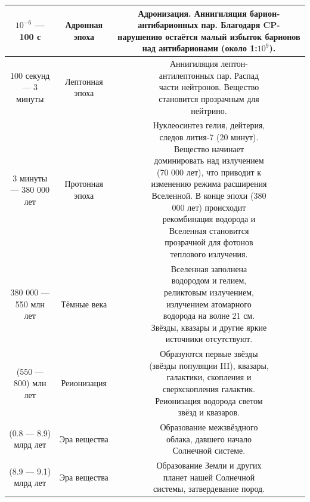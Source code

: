 \documentclass[a4paper,14pt]{article}
\makeatletter
\newcommand{\specialcell}[2][c]{%
  \begin{tabular}[#1]{@{}c@{}}#2\end{tabular}}
\makeatother
\begin{document}
\begin{center}
\begin{longtable}{|c|c|c|}
\hline
 $10^{-6}$ — 100 с& Адронная эпоха& \specialcell{Адронизация. Аннигиляция\\ барион-антибарионных пар.\\ Благодаря CP-нарушению\\ остаётся малый избыток\\ барионов над антибарионами\\ (около 1:$10^9$).} \\
\hline
 100 секунд — 3 минуты& Лептонная эпоха& \specialcell{Аннигиляция лептон-\\антилептонных пар. Распад\\ части нейтронов. Вещество\\ становится прозрачным для\\ нейтрино.} \\
\hline
 3 минуты — 380 000 лет& Протонная эпоха& \specialcell{Нуклеосинтез гелия, дейтерия,\\ следов лития-7 (20 минут).\\ Вещество начинает\\ доминировать над излучением\\ (70 000 лет), что приводит к\\ изменению режима расширения\\ Вселенной. В конце эпохи (380\\ 000 лет) происходит\\рекомбинация водорода и\\ Вселенная становится\\ прозрачной для фотонов\\ теплового излучения.} \\
\hline
 380 000 — 550 млн лет& Тёмные века& \specialcell{Вселенная заполнена\\ водородом и гелием,\\ реликтовым излучением,\\ излучением атомарного\\ водорода на волне 21 см.\\ Звёзды, квазары и другие яркие \\источники отсутствуют.} \\
\hline
 (550 — 800) млн лет& Реионизация& \specialcell{Образуются первые звёзды\\ (звёзды популяции III), квазары,\\ галактики, скопления и\\ сверхскопления галактик.\\ Реионизация водорода светом\\ звёзд и квазаров.} \\
\hline
 (0.8 — 8.9) млрд лет& Эра вещества& \specialcell{Образование межзвёздного\\ облака, давшего начало\\ Солнечной системе.} \\
\hline
 (8.9 — 9.1) млрд лет& Эра вещества& \specialcell{Образование Земли и других\\ планет нашей Солнечной\\ системы, затвердевание пород.} \\
\hline
\end{longtable}
\end{center}
\end{document}
